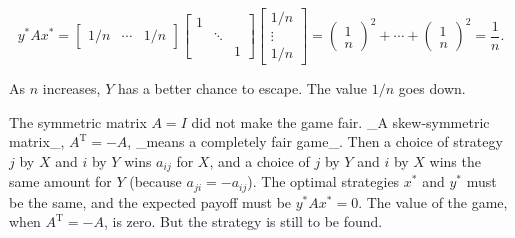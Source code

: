 \[y^{*}Ax^{*}=\begin{bmatrix}1/n&\cdots&1/n\end{bmatrix}\begin{bmatrix}1&&\\ &\ddots&\\ &&1\end{bmatrix}\begin{bmatrix}1/n\\ \vdots\\ 1/n\end{bmatrix}=\begin{pmatrix}1\\ n\end{pmatrix}^{2}+\cdots+\begin{pmatrix}1\\ n\end{pmatrix}^{2}=\frac{1}{n}.\]

As \(n\) increases, \(Y\) has a better chance to escape. The value \(1/n\) goes down.

The symmetric matrix \(A=I\) did not make the game fair. _A skew-symmetric matrix_, \(A^{\mathrm{T}}=-A\), _means a completely fair game_. Then a choice of strategy \(j\) by \(X\) and \(i\) by \(Y\) wins \(a_{ij}\) for \(X\), and a choice of \(j\) by \(Y\) and \(i\) by \(X\) wins the same amount for \(Y\) (because \(a_{ji}=-a_{ij}\)). The optimal strategies \(x^{*}\) and \(y^{*}\) must be the same, and the expected payoff must be \(y^{*}Ax^{*}=0\). The value of the game, when \(A^{\mathrm{T}}=-A\), is zero. But the strategy is still to be found.


